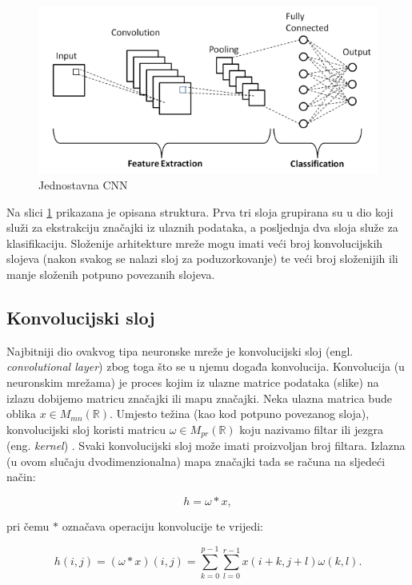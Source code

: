 \begin{figure}[htb]
    \centering
    \includegraphics[width=0.5\linewidth]{Chapters/neuronska_mreza/CNN/cnn.png} 
    \caption{Jednostavna CNN \cite{1}}
    \label{pic:cnn}
\end{figure}

Na slici \ref{pic:cnn} prikazana je opisana struktura. Prva tri sloja grupirana su
u dio koji služi za ekstrakciju značajki iz ulaznih podataka, a posljednja dva
sloja služe za klasifikaciju. Složenije arhitekture mreže mogu imati veći broj
konvolucijskih slojeva (nakon svakog se nalazi sloj za poduzorkovanje) te veći broj
složenijih ili manje složenih potpuno povezanih slojeva.

\subsection{Konvolucijski sloj}
\label{sub:conv}

Najbitniji dio ovakvog tipa neuronske mreže je konvolucijski sloj 
(engl. \textit{convolutional layer}) zbog toga što se
u njemu događa konvolucija. Konvolucija (u neuronskim mrežama) je proces kojim 
iz ulazne matrice podataka (slike) na izlazu dobijemo matricu značajki ili
mapu značajki. Neka ulazna matrica bude oblika \( x \in M_{mn}(\mathbb{R}) \).
Umjesto težina (kao kod potpuno povezanog sloja), konvolucijski sloj koristi
matricu \( \omega \in M_{pr}(\mathbb{R}) \) koju nazivamo filtar ili
jezgra (eng. \textit{kernel}) \cite{keras_layers}. Svaki konvolucijski 
sloj može imati proizvoljan broj filtara. Izlazna (u ovom slučaju dvodimenzionalna)
mapa značajki tada se računa na sljedeći način:

\begin{equation}
h = \omega * x,
\end{equation}

pri čemu \( * \) označava operaciju konvolucije te vrijedi:

\begin{equation}
h(i, j) = (\omega * x)(i, j) = 
\sum_{k=0}^{p-1} \sum_{l=0}^{r-1} x(i + k, j + l) \omega(k, l).
\end{equation}

